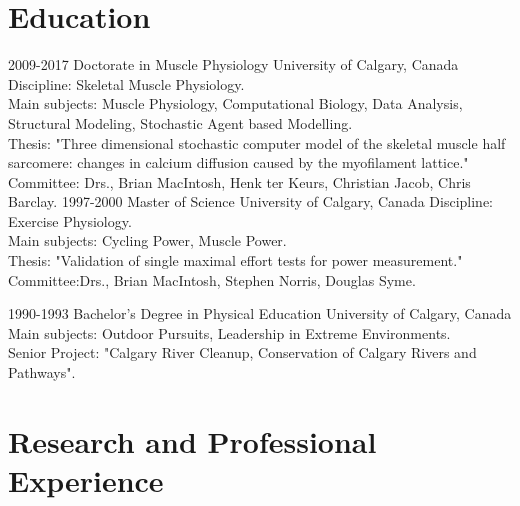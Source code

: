 \documentclass[]{friggeri-cv}
\begin{document}
\section{Education}
\begin{entrylist}
  \entry
    {2009-2017}
    {Doctorate in Muscle Physiology}
    {University of Calgary, Canada}
    {Discipline: Skeletal Muscle Physiology.\\
    Main subjects: Muscle Physiology, Computational Biology, Data Analysis, Structural Modeling, Stochastic Agent based Modelling.\\
    {Thesis:  "Three dimensional stochastic computer model of the skeletal muscle half sarcomere: changes in calcium diffusion caused by the myofilament lattice."}\\
    {Committee:} Drs., Brian MacIntosh, Henk ter Keurs, Christian Jacob,  Chris Barclay.}
  \entry
    {1997-2000}
    {Master of Science}
    {University of Calgary, Canada}
    {Discipline: Exercise Physiology.\\
    Main subjects: Cycling Power, Muscle Power.\\
     {Thesis:  "Validation of single maximal effort tests for power measurement."}\\
     {Committee:Drs., Brian MacIntosh, Stephen Norris, Douglas Syme.}}
  
  \entry
    {1990-1993}
    {Bachelor's Degree in Physical Education}
    {University of Calgary, Canada}
    {Main subjects: Outdoor Pursuits, Leadership in Extreme Environments.\\
    {Senior Project: "Calgary River Cleanup, Conservation of Calgary Rivers and Pathways".}}
 
\end{entrylist}


\section{Research and Professional Experience}
\end{document}
